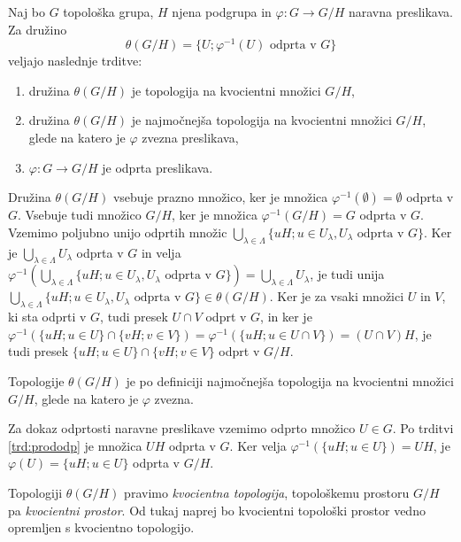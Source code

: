 \documentclass[mat1]{fmfdelo}
\begin{document}
\begin{izrek}\label{izr:topkvocienta}
Naj bo $G$ topološka grupa, $H$ njena podgrupa in $\varphi\colon G \to G/H$ naravna preslikava. Za družino \[\theta(G/H) = \lbrace U ; \varphi^{-1}(U) \text{ odprta v } G \rbrace\]
veljajo naslednje trditve:
\begin{enumerate}
\item družina $\theta(G/H)$ je topologija na kvocientni množici $G/H$,
\item družina $\theta(G/H)$ je najmočnejša topologija na kvocientni množici $G/H$, glede na katero je $\varphi$ zvezna preslikava,
\item $\varphi: G \to G/H$ je odprta preslikava.
\end{enumerate}
\end{izrek}

\begin{dokaz}
Družina $\theta(G/H)$ vsebuje prazno množico, ker je množica $\varphi^{-1}(\emptyset) = \emptyset$ odprta v $G$. Vsebuje tudi množico $G/H$, ker je množica $\varphi^{-1}(G/H) = G$ odprta v $G$. Vzemimo poljubno unijo odprtih množic $\bigcup_{\lambda \in \Lambda}\lbrace uH ; u \in U_\lambda, U_\lambda \text{ odprta v } G\rbrace$. Ker je $\bigcup_{\lambda \in \Lambda} U_\lambda$ odprta v $G$ in velja $\varphi^{-1}(\bigcup_{\lambda \in \Lambda}\lbrace uH ; u \in U_\lambda, U_\lambda \text{ odprta v } G\rbrace) = \bigcup_{\lambda \in \Lambda} U_\lambda$, je tudi unija $\bigcup_{\lambda \in \Lambda}\lbrace uH ; u \in U_\lambda, U_\lambda \text{ odprta v } G\rbrace \in \theta(G/H)$. Ker je za vsaki množici $U$ in $V$, ki sta odprti v $G$, tudi presek $U \cap V$ odprt v $G$, in ker je $\varphi^{-1}(\lbrace uH ; u \in U\rbrace \cap \lbrace vH ; v \in V \rbrace) = \varphi^{-1}(\lbrace uH ; u \in U \cap V \rbrace) = (U \cap V)H$, je tudi presek $\lbrace uH ; u \in U\rbrace \cap \lbrace vH ; v \in V \rbrace$ odprt v $G/H$.

Topologije $\theta(G/H)$ je po definiciji najmočnejša topologija na kvocientni množici $G/H$, glede na katero je $\varphi$ zvezna.

Za dokaz odprtosti naravne preslikave vzemimo odprto množico $U \in G$. Po trditvi \ref{trd:prododp} je množica $UH$ odprta v $G$. Ker velja $\varphi^{-1}(\lbrace uH ; u \in U \rbrace) = UH$, je $\varphi(U) = \lbrace uH ; u \in U \rbrace$ odprta v $G/H$.
\end{dokaz}

Topologiji $\theta(G/H)$ pravimo \emph{kvocientna topologija}, topološkemu prostoru $G/H$ pa \emph{kvocientni prostor}. Od tukaj naprej bo kvocientni topološki prostor vedno opremljen s kvocientno topologijo.
\end{document}
